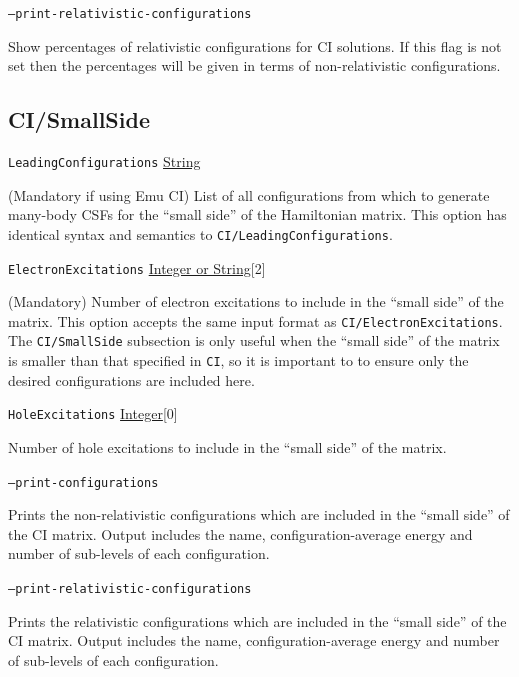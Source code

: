 \documentclass{report}
\begin{document}
\texttt{--print-relativistic-configurations}
\begin{adjustwidth}{1cm}{}
Show percentages of relativistic configurations for CI solutions. If this flag is not set then the
percentages will be given in terms of non-relativistic configurations.
\end{adjustwidth}

\subsection{CI/SmallSide}
\texttt{LeadingConfigurations} \uline{String}
\begin{adjustwidth}{1cm}{}
(Mandatory if using Emu CI) List of all configurations from which to generate many-body CSFs for the 
``small side'' of the Hamiltonian matrix. This option has identical syntax and semantics to
\texttt{CI/LeadingConfigurations}.
\end{adjustwidth}

\texttt{ElectronExcitations} \uline{Integer or String}[2]
\begin{adjustwidth}{1cm}{}
(Mandatory) Number of electron excitations to include in the ``small side'' of the matrix. This option
accepts the same input format as \texttt{CI/ElectronExcitations}. The \texttt{CI/SmallSide} subsection
is only useful when the ``small side'' of the matrix is smaller than that specified in \texttt{CI}, so
it is important to to ensure only the desired configurations are included here.
\end{adjustwidth}

\texttt{HoleExcitations} \uline{Integer}[0]
\begin{adjustwidth}{1cm}{}
Number of hole excitations to include in the ``small side'' of the matrix.
\end{adjustwidth}

\texttt{--print-configurations}
\begin{adjustwidth}{1cm}{}
Prints the non-relativistic configurations which are included in the ``small side'' of the CI matrix.
Output includes the name, configuration-average energy and number of sub-levels of each configuration.
\end{adjustwidth}

\texttt{--print-relativistic-configurations}
\begin{adjustwidth}{1cm}{}
Prints the relativistic configurations which are included in the ``small side'' of the CI matrix.
Output includes the name, configuration-average energy and number of sub-levels of each configuration.
\end{adjustwidth}
\end{document}

